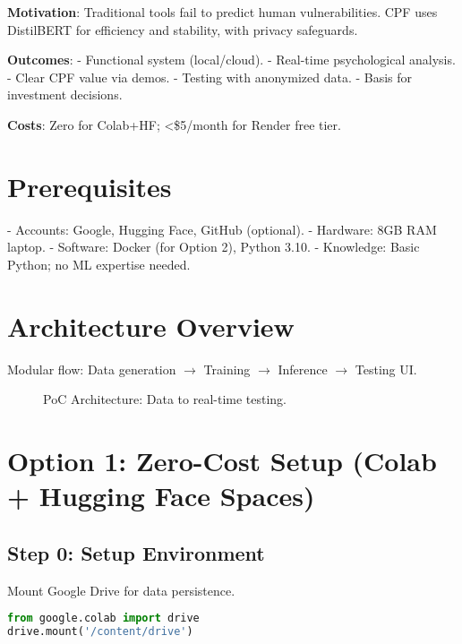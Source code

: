\documentclass[11pt,a4paper]{article}
\begin{document}
\textbf{Motivation}: Traditional tools fail to predict human vulnerabilities. CPF uses DistilBERT for efficiency and stability, with privacy safeguards.

\textbf{Outcomes}:
- Functional system (local/cloud).
- Real-time psychological analysis.
- Clear CPF value via demos.
- Testing with anonymized data.
- Basis for investment decisions.

\textbf{Costs}: Zero for Colab+HF; <\$5/month for Render free tier.

\section{Prerequisites}

- Accounts: Google, Hugging Face, GitHub (optional).
- Hardware: 8GB RAM laptop.
- Software: Docker (for Option 2), Python 3.10.
- Knowledge: Basic Python; no ML expertise needed.

\section{Architecture Overview}

Modular flow: Data generation $\rightarrow$ Training $\rightarrow$ Inference $\rightarrow$ Testing UI.

\begin{figure}[H]
\centering
{}
\caption{PoC Architecture: Data to real-time testing.}
\label{fig:architecture}
\end{figure}

\section{Option 1: Zero-Cost Setup (Colab + Hugging Face Spaces)}

\subsection{Step 0: Setup Environment}
Mount Google Drive for data persistence.

\begin{lstlisting}[language=Python, caption=Mount Google Drive]
from google.colab import drive
drive.mount('/content/drive')
\end{lstlisting}
\end{document}
